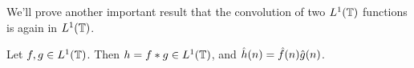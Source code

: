   We'll prove another important result that the convolution of two $L^1(\mathbb T)$ functions is again in $L^1(\mathbb T)$.
  \begin{theorem}
    \label{thm:convolution_is_in_L1}
  Let $f, g \in L^1(\mathbb T)$. Then $h = f*g \in L^1(\mathbb T)$, and $\hat{h}(n) = \hat{f}(n)\hat{g}(n)$.
  \end{theorem}

